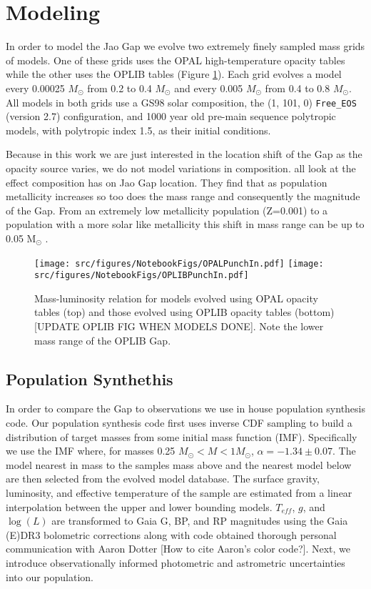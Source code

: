 \section{Modeling}\label{sec:modeling}
In order to model the Jao Gap we evolve two extremely finely sampled mass grids
of models. One of these grids uses the OPAL high-temperature opacity tables
while the other uses the OPLIB tables (Figure \ref{fig:PunchIn}). Each grid
evolves a model every 0.00025 $M_{\odot}$ from 0.2 to 0.4 $M_{\odot}$ and every
0.005 $M_{\odot}$ from 0.4 to 0.8 $M_{\odot}$. All models in both grids use a
GS98 solar composition, the (1, 101, 0) \texttt{Free\_EOS} (version
{\color{red}2.7}) configuration, and 1000 year old pre-main sequence polytropic
models, with polytropic index 1.5, as their initial conditions.

Because in this work we are just interested in the location shift of the Gap as
the opacity source varies, we do not model variations in composition.
\citet{Mansfield2021,Jao2020,Feiden2021} all look at the effect composition has
on Jao Gap location. They find that as population metallicity increases so too
does the mass range and consequently the magnitude of the Gap. From an extremely
low metallicity population (Z=0.001) to a population with a more solar like
metallicity this shift in mass range can be up to 0.05 M$_{\odot}$
\citep{Mansfield2021}.

\begin{figure}
	\centering
	\texttt{[image: src/figures/NotebookFigs/OPALPunchIn.pdf]}
	\texttt{[image: src/figures/NotebookFigs/OPLIBPunchIn.pdf]}
	\caption{Mass-luminosity relation for models evolved using OPAL opacity
	tables (top) and those evolved using OPLIB opacity tables (bottom)
	{\color{red}[UPDATE OPLIB FIG WHEN MODELS DONE]}. Note the lower mass range
	of the OPLIB Gap.}
	\label{fig:PunchIn}
		
\end{figure}

\subsection{Population Synthethis}
In order to compare the Gap to observations we use in house population
synthesis code. Our population synthesis code first uses inverse CDF sampling
to build a distribution of target masses from some initial mass function (IMF).
Specifically we use the \citet{Sollima2019} IMF where, for masses 0.25
$M_{\odot} < M < 1 M_{\odot}$, $\alpha=-1.34\pm0.07$. The model nearest in mass
to the samples mass above and the nearest model below are then selected from
the evolved model database. The surface gravity, luminosity, and effective
temperature of the sample are estimated from a linear interpolation between the
upper and lower bounding models. $T_{eff}$, $g$, and $\log(L)$ are transformed
to Gaia G, BP, and RP magnitudes using the Gaia (E)DR3 bolometric corrections
\citep{Creevey2022} along with code obtained thorough personal communication
with Aaron Dotter {\color{red}[How to cite Aaron's color code?]}. Next, we
introduce observationally informed photometric and astrometric uncertainties
into our population.

